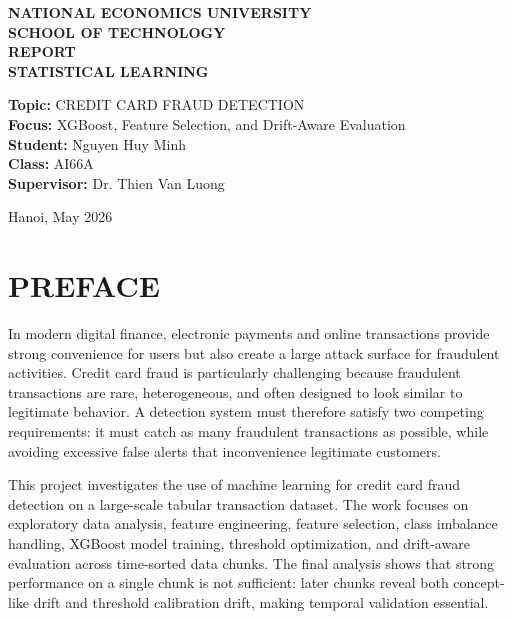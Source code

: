 \documentclass[12pt,a4paper]{article}
\newcommand{\projecttitle}{Credit Card Fraud Detection}
\newcommand{\reportauthor}{Nguyen Huy Minh}
\newcommand{\classname}{AI66A}
\newcommand{\supervisor}{Dr. Thien Van Luong}
\newcommand{\reportdate}{Hanoi, May 2026}
\newcommand{\frontsection}[1]{%
    \section*{\centering #1}%
    \addcontentsline{toc}{section}{#1}%
}
\begin{document}
\begin{titlepage}
    \centering
    {\large \textbf{NATIONAL ECONOMICS UNIVERSITY}}\\
    {\large \textbf{SCHOOL OF TECHNOLOGY}}\\[2.2cm]

    {\Large \textbf{REPORT}}\\[0.35cm]
    {\large \textbf{STATISTICAL LEARNING}}\\[1.7cm]

    \begin{flushleft}
    \hspace{1.5cm}\textbf{Topic:} \MakeUppercase{\projecttitle}\\[0.35cm]
    \hspace{1.5cm}\textbf{Focus:} XGBoost, Feature Selection, and Drift-Aware Evaluation\\[0.35cm]
    \hspace{1.5cm}\textbf{Student:} \reportauthor\\[0.35cm]
    \hspace{1.5cm}\textbf{Class:} \classname\\[0.35cm]
    \hspace{1.5cm}\textbf{Supervisor:} \supervisor
    \end{flushleft}

    \vfill
    {\large \reportdate}
\end{titlepage}


\frontsection{PREFACE}

In modern digital finance, electronic payments and online transactions provide strong convenience for users but also create a large attack surface for fraudulent activities. Credit card fraud is particularly challenging because fraudulent transactions are rare, heterogeneous, and often designed to look similar to legitimate behavior. A detection system must therefore satisfy two competing requirements: it must catch as many fraudulent transactions as possible, while avoiding excessive false alerts that inconvenience legitimate customers.

This project investigates the use of machine learning for credit card fraud detection on a large-scale tabular transaction dataset. The work focuses on exploratory data analysis, feature engineering, feature selection, class imbalance handling, XGBoost model training, threshold optimization, and drift-aware evaluation across time-sorted data chunks. The final analysis shows that strong performance on a single chunk is not sufficient: later chunks reveal both concept-like drift and threshold calibration drift, making temporal validation essential.
\end{document}
